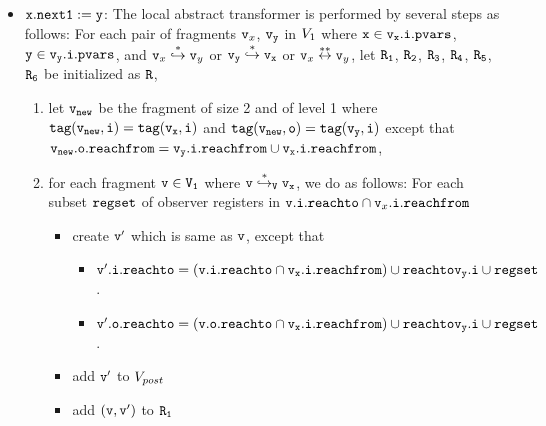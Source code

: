 \begin{itemize}

\item  ${\tt x.next1:= y}$: The local abstract transformer is performed by several steps as follows: For each pair of fragments $\mathtt{v}_x$, $\tt \mathtt{v}_y$ in $V_1$ where $\tt x \in \mathtt{v}_x.\mathtt{i}.\mathtt{pvars}$, $\tt y \in\mathtt{v}_y.\mathtt{i}.\mathtt{pvars}$, and $\mathtt{v}_x \overset{*}\hookrightarrow \mathtt{v}_y$ or $\tt \mathtt{v}_y \overset{*}\hookrightarrow \mathtt{v}_x$ or $\mathtt{v}_x \overset{**}\leftrightarrow \mathtt{v}_y$, let $\tt R_1$, $\tt R_2$, $\tt R_3$, $\tt R_4$, $\tt R_5$, $\tt R_6$ be initialized as $\tt R$,  
\begin{enumerate}
\item let $\tt \mathtt{v}_{new}$ be the fragment of size 2 and of level 1 where $\tt tag(\mathtt{v}_{new},i) = tag(\mathtt{v}_x, i)$ and $\tt tag(\mathtt{v}_{new},o) = tag(\mathtt{v}_y,i)$ except that $\tt \mathtt{v}_{new}.\mathtt{o}.\mathtt{reachfrom} = \mathtt{v}_y.\mathtt{i}.\mathtt{reachfrom} \cup \mathtt{v}_x.\mathtt{i}.\mathtt{reachfrom}$,
\item  for each fragment $\tt v \in V_1$ where $\tt v \overset{*}\hookrightarrow_{V} \mathtt{v}_x$, we do as follows: For each subset $\mathtt{regset}$ of observer registers in $\mathtt{v}.\mathtt{i}.\mathtt{reachto} \cap \mathtt{v}_x.\mathtt{i}.\mathtt{reachfrom}$


\begin{itemize}
\item create $\tt v'$ which is same as $\tt v$, except that
\begin{itemize}
\item $\mathtt{v}'.\mathtt{i}.\mathtt{reachto} = (\tt \mathtt{v}.\mathtt{i}.\mathtt{reachto} \cap \mathtt{v}_x.\mathtt{i}.\mathtt{reachfrom}) \cup \mathtt{reachto}{\mathtt{v}_y.\mathtt{i}} \cup \mathtt{regset}$.
\item $\mathtt{v}'.\mathtt{o}.\mathtt{reachto} = (\tt \mathtt{v}.\mathtt{o}.\mathtt{reachto} \cap \mathtt{v}_x.\mathtt{i}.\mathtt{reachfrom}) \cup \mathtt{reachto}{\mathtt{v}_y.\mathtt{i}} \cup \mathtt{regset}$.
\end{itemize}
\item add $\tt v'$ to $V_{post}$ 
\item add $\tt (v,v')$ to $\tt R_1$
\end{itemize}


\end{enumerate}
\end{itemize}

